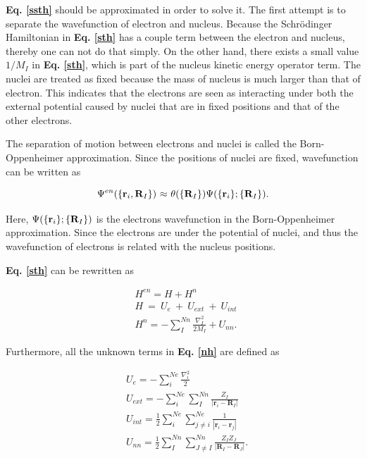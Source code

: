 \documentclass[a4paper, 12pt, titlepage,oneside,drop]{kthesis}
\begin{document}
\textbf{Eq. \ref{ssth}} should be approximated in order to solve it. The first attempt is to separate the wavefunction of electron and nucleus. Because the Schrödinger Hamiltonian in \textbf{Eq. \ref{sth}} has a couple term between the electron and nucleus, 
thereby one can not do that simply. On the other hand, there exists a small value ${1}/{M_I}$ in \textbf{Eq. \ref{sth}}, which is part of the nucleus kinetic energy
operator term. The nuclei are treated as fixed because the mass of nucleus is much larger than that of electron. This indicates that the electrons are seen as interacting under both the external potential caused by nuclei 
that are in fixed positions and that of the other electrons. 

The separation of motion between electrons and nuclei is called the Born-Oppenheimer approximation. Since the positions of nuclei are fixed, wavefunction can be written as

\begin{equation}\label{nwf}
{\Psi^{en}(\{ {\textbf r}_{i}, {\textbf R}_{I} \})} \   {\approx} \  {\theta(\{{\textbf R}_{I}\})} {\Psi(\{\textbf{r}_{i}\}; \{{\textbf R}_{I}\})}.
\end{equation}

Here, ${\Psi(\{\textbf{r}_{i}\}; \{{\textbf R}_{I}\})}$  is the electrons wavefunction in the Born-Oppenheimer approximation. Since the electrons are under the potential of nuclei, and thus the wavefunction of 
electrons is related with the nucleus positions. 
 
\textbf{Eq. \ref{sth}} can be rewritten as

\begin{equation}\begin{split}\label{nh}
& {H^{en}} = H + H^n \\
& {H}\ = \ {U_e} \ + \ {U}_{ext} \ + \ {U}_{int}\  \\
& {H^n} = - \sum\limits_I^{Nn} \frac{{{\nabla}_{{I}}^{2}}}{2 M_{I}} + {{U}_{nn}}.
 \end{split}
\end{equation}

Furthermore, all the unknown terms in \textbf{Eq. \ref{nh}} are defined as

\begin{equation}\begin{split}\label{vext}
& {U_e} = - \sum\limits_i^{{Ne}}   \frac{{{\nabla}_{{i}}^{2}}}{2} \\
& U_{ext} = - \sum\limits_i^{{Ne}} \sum\limits_I^{{Nn}} \frac{Z_{I}}{|\textbf{r}_{i}-\textbf{R}_{I}|} \\
& {U}_{int} =  \frac{1}{2} \sum\limits_i^{{Ne}} \sum\limits_{j \neq i}^{{Ne}} \frac{1}{ |\textbf{r}_{i}-\textbf{r}_{j}|} \\
& {{U}_{nn}} = \frac{1}{2} \sum\limits_I^{{Nn}} \sum\limits_{J \neq I}^{{Nn}} \frac{Z_{I} Z_{J}\ }{|\textbf{R}_{I}-\textbf{R}_{J}|}.
\end{split}
\end{equation}
\end{document}
